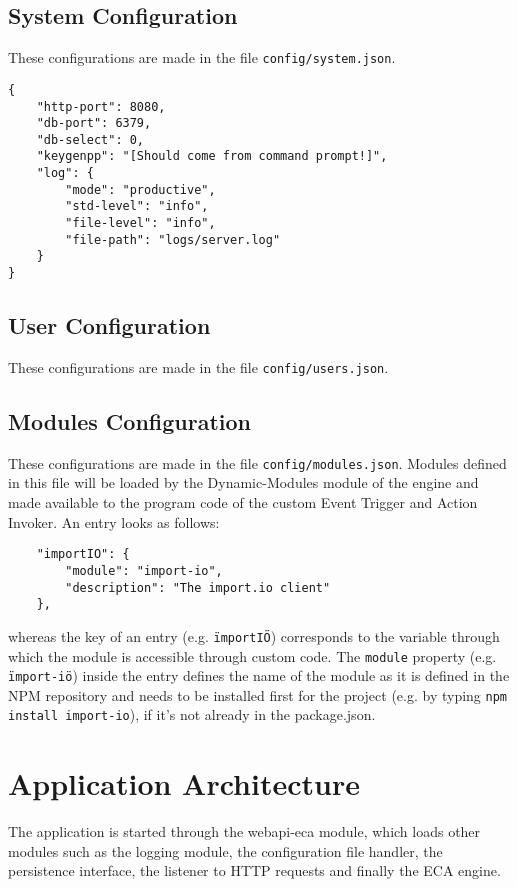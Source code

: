 \documentclass{article}
\begin{document}
	\subsection{System Configuration}
		These configurations are made in the file \texttt{config/system.json}.
\begin{lstlisting}
{
	"http-port": 8080,
	"db-port": 6379,
	"db-select": 0,
	"keygenpp": "[Should come from command prompt!]",
	"log": {
		"mode": "productive",
		"std-level": "info",
		"file-level": "info",
		"file-path": "logs/server.log"
	}
}
\end{lstlisting}

	\subsection{User Configuration}
		These configurations are made in the file \texttt{config/users.json}.

	\subsection{Modules Configuration}
		These configurations are made in the file \texttt{config/modules.json}.
		Modules defined in this file will be loaded by the Dynamic-Modules module of the engine
		and made available to the program code of the custom Event Trigger and Action Invoker.
		An entry looks as follows:
\begin{lstlisting}
	"importIO": {
		"module": "import-io",
		"description": "The import.io client"
	},
\end{lstlisting}
		whereas the key of an entry (e.g. \texttt{\"importIO\"}) corresponds to the variable through which the module is accessible
		through custom code. The \texttt{module} property (e.g. \texttt{\"import-io\"}) inside the entry
		defines the name of the module as it is defined in the NPM repository and needs to be installed
		first for the project (e.g. by typing \texttt{npm install import-io}), if it's not already in the package.json.



\section{Application Architecture}
The application is started through the webapi-eca module, which loads other modules such as the logging module, the configuration file handler, the persistence interface, the listener to HTTP requests and finally the ECA engine.
\end{document}
